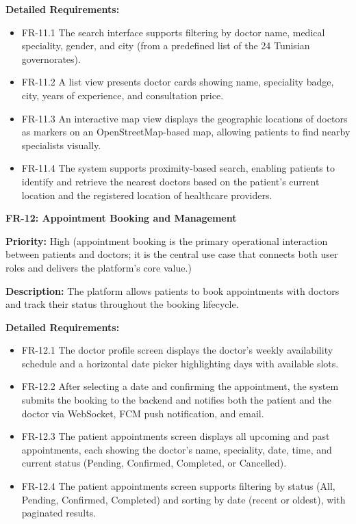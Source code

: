 \textbf{Detailed Requirements:}
\begin{itemize}
    \item FR-11.1 \; The search interface supports filtering by doctor name, medical
    speciality, gender, and city (from a predefined list of the 24 Tunisian governorates).
    \item FR-11.2 \; A list view presents doctor cards showing name, speciality badge,
    city, years of experience, and consultation price.
    \item FR-11.3 \; An interactive map view displays the geographic locations of
    doctors as markers on an OpenStreetMap-based map, allowing patients to find
    nearby specialists visually.
    \item FR-11.4 \; The system supports proximity-based search, enabling patients to
    identify and retrieve the nearest doctors based on the patient's current location
    and the registered location of healthcare providers.
\end{itemize}

\medskip

\textbf{FR-12: Appointment Booking and Management}

\textbf{Priority:} High (appointment booking is the primary operational interaction between patients and doctors; it is the central use case that connects both user roles and delivers the platform's core value.)

\textbf{Description:} The platform allows patients to book appointments with doctors
and track their status throughout the booking lifecycle.

\textbf{Detailed Requirements:}
\begin{itemize}
    \item FR-12.1 \; The doctor profile screen displays the doctor's weekly availability
    schedule and a horizontal date picker highlighting days with available slots.
    \item FR-12.2 \; After selecting a date and confirming the appointment, the system
    submits the booking to the backend and notifies both the patient and the doctor
    via WebSocket, FCM push notification, and email.
    \item FR-12.3 \; The patient appointments screen displays all upcoming and past
    appointments, each showing the doctor's name, speciality, date, time, and current
    status (Pending, Confirmed, Completed, or Cancelled).
    \item FR-12.4 \; The patient appointments screen supports filtering by status
    (All, Pending, Confirmed, Completed) and sorting by date (recent or oldest),
    with paginated results.
\end{itemize}

